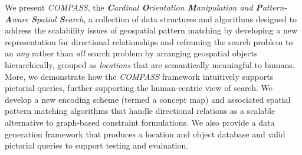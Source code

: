 \par{
    We present \emph{COMPASS}, the \textit{\textbf{C}ardinal \textbf{O}rientation \textbf{M}anipulation and \textbf{P}attern-\textbf{A}ware \textbf{S}patial \textbf{S}earch}, a collection of data structures and algorithms designed to address the scalability issues of geospatial pattern matching by developing a new representation for directional relationships and reframing the search problem to an \textit{any} rather than \textit{all} search problem by arranging geospatial objects hierarchically, grouped as \textit{locations} that are semantically meaningful to humans.
    More, we demonstrate how the \emph{COMPASS} framework intuitively supports pictorial queries, further supporting the human-centric view of search.   
    We develop a new encoding scheme (termed a concept map) and associated spatial pattern matching algorithms that handle directional relations as a scalable alternative to graph-based constraint formulations.
    We also provide a data generation framework that produces a location and object database and valid pictorial queries to support testing and evaluation.
    
        

}
